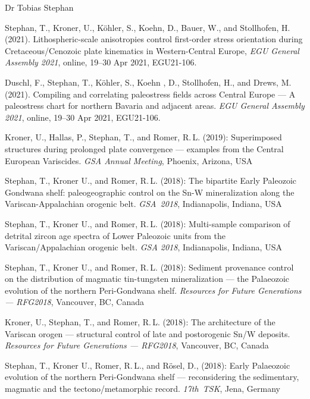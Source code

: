 \documentclass[10pt, paper=letter]{scrartcl} %
\begin{document}
\begin{cv}{\textcolor{myred}{\textsf{Dr Tobias Stephan}}}
\begin{cvlist}{}
        \item[18] Stephan, T., Kroner, U., K\"ohler, S., Koehn, D., Bauer, W., and Stollhofen, H. (2021). Lithospheric-scale anisotropies control first-order stress orientation during Cretaceous\-/Cenozoic plate kinematics in Western-Central Europe, \textit{EGU General Assembly 2021}, online, 19--30 Apr 2021, EGU21-106. 
        \item[17] Duschl, F., Stephan, T., K\"ohler, S., Koehn , D., Stollhofen, H., and Drews, M. (2021). Compiling and correlating paleostress fields across Central Europe --- A paleostress chart for northern Bavaria and adjacent areas. \textit{EGU General Assembly 2021}, online, 19--30 Apr 2021, EGU21-106. 

        \item[16] Kroner, U., Hallas, P., Stephan, T., and Romer, R.\,L. (2019): Superimposed structures during prolonged plate convergence --- examples from the Central European Variscides. \textit{GSA Annual Meeting}, Phoenix, Arizona, USA
        \item[15] Stephan, T., Kroner U., and Romer, R.\,L. (2018): The bipartite Early Paleozoic Gondwana shelf: paleogeographic control on the Sn-W mineralization along the Variscan-Appalachian orogenic belt. \mbox{\textit{GSA 2018}}, Indianapolis, Indiana, USA
        \item[14] Stephan, T., Kroner U., and Romer, R.\,L. (2018): Multi-sample comparison of detrital zircon age spectra of Lower Paleozoic units from the Variscan\-/Appalachian orogenic belt. \textit{GSA 2018}, Indianapolis, Indiana, USA
        \item[13] Stephan, T., Kroner U., and Romer, R.\,L. (2018): Sediment provenance control on the distribution of magmatic tin-tungsten mineralization --- the Palaeozoic evolution of the northern Peri-Gondwana shelf. \textit{Resources for Future Generations --- RFG2018}, Vancouver, BC, Canada
        \item[12]Kroner, U., Stephan, T., and Romer, R.\,L. (2018): The architecture of the Variscan orogen --- structural control of late and postorogenic Sn/W deposits.  \textit{Resources for Future Generations --- RFG2018}, Vancouver, BC, Canada
        \item[11] Stephan, T., Kroner U., Romer, R.\,L., and R\"osel, D., (2018): Early Palaeozoic evolution of the northern Peri-Gondwana shelf --- reconsidering the sedimentary, magmatic and the tectono\-/metamorphic record. \mbox{\textit{17th TSK}}, Jena, Germany

\end{cvlist}
\end{cv}
\end{document}
